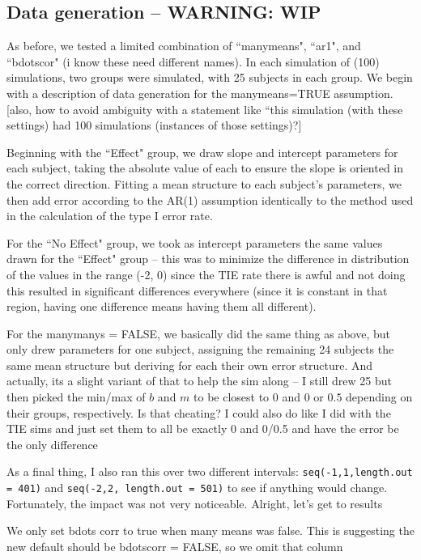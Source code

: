 \documentclass{article}
\newcommand{\xt}{\texttt}
\begin{document}
\subsection{Data generation -- WARNING: WIP} As before, we tested a limited combination of ``manymeans", ``ar1", and ``bdotscor" (i know these need different names). In each simulation of (100) simulations, two groups were simulated, with 25 subjects in each group. We begin with a description of data generation for the manymeans=TRUE assumption. [also, how to avoid ambiguity with a statement like ``this simulation (with these settings) had 100 simulations (instances of those settings)?]

Beginning with the ``Effect" group, we draw slope and intercept parameters for each subject, taking the absolute value of each to ensure the slope is oriented in the correct direction. Fitting a mean structure to each subject's parameters, we then add error according to the AR(1) assumption identically to the method used in the calculation of the type I error rate.

For the ``No Effect" group, we took as intercept parameters the same values drawn for the ``Effect" group -- this was to minimize the difference in distribution of the values in the range (-2, 0) since the TIE rate there is awful and not doing this resulted in significant differences everywhere (since it is constant in that region, having one difference means having them all different). 

For the manymanys = FALSE, we basically did the same thing as above, but only drew parameters for one subject, assigning the remaining 24 subjects the same mean structure but deriving for each their own error structure. And actually, its a slight variant of that to help the sim along -- I still drew 25 but then picked the min/max of $b$ and $m$ to be closest to $0$ and $0$ or $0.5$ depending on their groups, respectively. Is that cheating? I could also do like I did with the TIE sims and just set them to all be exactly 0 and 0/0.5 and have the error be the only difference

As a final thing, I also ran this over two different intervals: \xt{seq(-1,1,length.out = 401)} and \xt{seq(-2,2, length.out = 501)} to see if anything would change. Fortunately, the impact was not very noticeable. Alright, let's get to results

We only set bdots corr to true when many means was false. This is suggesting the new default should be bdotscorr = FALSE, so we omit that column
\end{document}

